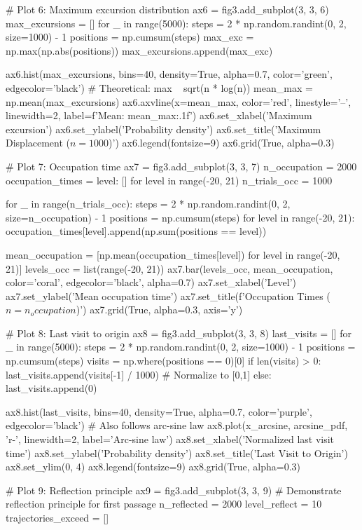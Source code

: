 \documentclass[a4paper, 11pt]{article}
\begin{document}
\begin{pycode}
# Plot 6: Maximum excursion distribution
ax6 = fig3.add_subplot(3, 3, 6)
max_excursions = []
for _ in range(5000):
    steps = 2 * np.random.randint(0, 2, size=1000) - 1
    positions = np.cumsum(steps)
    max_exc = np.max(np.abs(positions))
    max_excursions.append(max_exc)

ax6.hist(max_excursions, bins=40, density=True, alpha=0.7, color='green',
         edgecolor='black')
# Theoretical: max ~ sqrt(n * log(n))
mean_max = np.mean(max_excursions)
ax6.axvline(x=mean_max, color='red', linestyle='--', linewidth=2,
            label=f'Mean: {mean_max:.1f}')
ax6.set_xlabel('Maximum excursion')
ax6.set_ylabel('Probability density')
ax6.set_title('Maximum Displacement ($n=1000$)')
ax6.legend(fontsize=9)
ax6.grid(True, alpha=0.3)

# Plot 7: Occupation time
ax7 = fig3.add_subplot(3, 3, 7)
n_occupation = 2000
occupation_times = {level: [] for level in range(-20, 21)}
n_trials_occ = 1000

for _ in range(n_trials_occ):
    steps = 2 * np.random.randint(0, 2, size=n_occupation) - 1
    positions = np.cumsum(steps)
    for level in range(-20, 21):
        occupation_times[level].append(np.sum(positions == level))

mean_occupation = [np.mean(occupation_times[level]) for level in range(-20, 21)]
levels_occ = list(range(-20, 21))
ax7.bar(levels_occ, mean_occupation, color='coral', edgecolor='black', alpha=0.7)
ax7.set_xlabel('Level')
ax7.set_ylabel('Mean occupation time')
ax7.set_title(f'Occupation Times ($n={n_occupation}$)')
ax7.grid(True, alpha=0.3, axis='y')

# Plot 8: Last visit to origin
ax8 = fig3.add_subplot(3, 3, 8)
last_visits = []
for _ in range(5000):
    steps = 2 * np.random.randint(0, 2, size=1000) - 1
    positions = np.cumsum(steps)
    visits = np.where(positions == 0)[0]
    if len(visits) > 0:
        last_visits.append(visits[-1] / 1000)  # Normalize to [0,1]
    else:
        last_visits.append(0)

ax8.hist(last_visits, bins=40, density=True, alpha=0.7, color='purple',
         edgecolor='black')
# Also follows arc-sine law
ax8.plot(x_arcsine, arcsine_pdf, 'r-', linewidth=2, label='Arc-sine law')
ax8.set_xlabel('Normalized last visit time')
ax8.set_ylabel('Probability density')
ax8.set_title('Last Visit to Origin')
ax8.set_ylim(0, 4)
ax8.legend(fontsize=9)
ax8.grid(True, alpha=0.3)

# Plot 9: Reflection principle
ax9 = fig3.add_subplot(3, 3, 9)
# Demonstrate reflection principle for first passage
n_reflected = 2000
level_reflect = 10
trajectories_exceed = []


\end{pycode}
\end{document}
